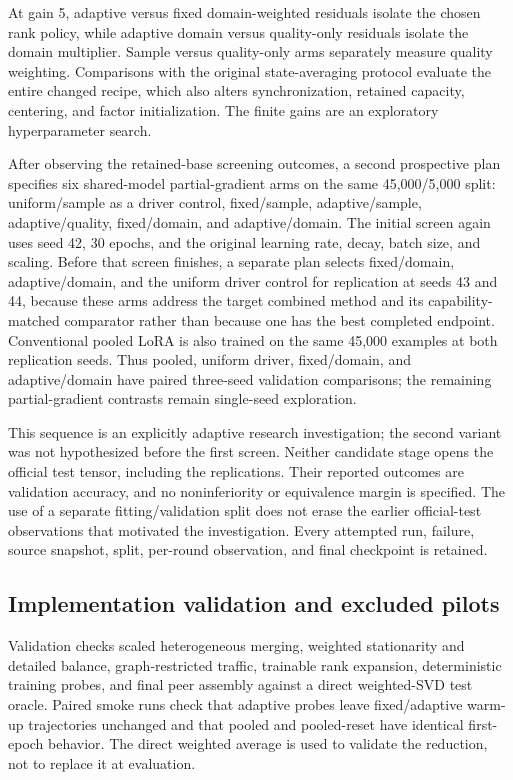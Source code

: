 \documentclass[11pt]{article}
\begin{document}
At gain 5, adaptive versus fixed domain-weighted residuals isolate the chosen rank policy, while adaptive domain versus quality-only residuals isolate the domain multiplier. Sample versus quality-only arms separately measure quality weighting. Comparisons with the original state-averaging protocol evaluate the entire changed recipe, which also alters synchronization, retained capacity, centering, and factor initialization. The finite gains are an exploratory hyperparameter search.

After observing the retained-base screening outcomes, a second prospective plan specifies six shared-model partial-gradient arms on the same 45,000/5,000 split: uniform/sample as a driver control, fixed/sample, adaptive/sample, adaptive/quality, fixed/domain, and adaptive/domain. The initial screen again uses seed 42, 30 epochs, and the original learning rate, decay, batch size, and scaling. Before that screen finishes, a separate plan selects fixed/domain, adaptive/domain, and the uniform driver control for replication at seeds 43 and 44, because these arms address the target combined method and its capability-matched comparator rather than because one has the best completed endpoint. Conventional pooled LoRA is also trained on the same 45,000 examples at both replication seeds. Thus pooled, uniform driver, fixed/domain, and adaptive/domain have paired three-seed validation comparisons; the remaining partial-gradient contrasts remain single-seed exploration.

This sequence is an explicitly adaptive research investigation; the second variant was not hypothesized before the first screen. Neither candidate stage opens the official test tensor, including the replications. Their reported outcomes are validation accuracy, and no noninferiority or equivalence margin is specified. The use of a separate fitting/validation split does not erase the earlier official-test observations that motivated the investigation. Every attempted run, failure, source snapshot, split, per-round observation, and final checkpoint is retained.

\subsection{Implementation validation and excluded pilots}
Validation checks scaled heterogeneous merging, weighted stationarity and detailed balance, graph-restricted traffic, trainable rank expansion, deterministic training probes, and final peer assembly against a direct weighted-SVD test oracle. Paired smoke runs check that adaptive probes leave fixed/adaptive warm-up trajectories unchanged and that pooled and pooled-reset have identical first-epoch behavior. The direct weighted average is used to validate the reduction, not to replace it at evaluation.
\end{document}
